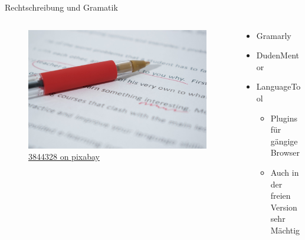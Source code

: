 \documentclass[aspectratio=169,shownotes]{beamer}
\begin{document}
\begin{frame}{Rechtschreibung und Gramatik}
    \begin{columns}[t]
        \begin{column}{0.4\textwidth}
            \vspace{-2em} 
            \begin{figure}
                \begin{flushleft}
                    \includegraphics[height=0.6\textheight,trim={8cm 10 2cm 0},clip]{graphics/correcting-1870721_1280.jpg}
                    \caption*{\href{https://pixabay.com/photos/correcting-proof-paper-correction-1870721/}{3844328 on pixabay}}    
                \end{flushleft}                
            \end{figure}
            
        \end{column}
        \begin{column}{0.6\textwidth}
            \begin{itemize}
                \item Gramarly
                \item DudenMentor
                \item LanguageTool
                \begin{itemize}
                    \item Plugins für gängige Browser
                    \item Auch in der freien Version sehr Mächtig
                \end{itemize}
            \end{itemize}
        \end{column}
    \end{columns}
\end{frame}
\end{document}
